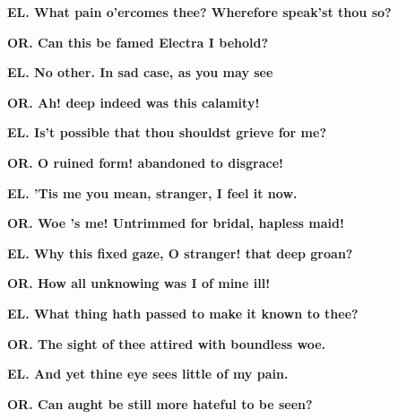 \documentclass[11pt,letter]{book}
\begin{document}
\par \textbf{EL. What pain o’ercomes thee? Wherefore speak’st thou so?}
\par 

\par \textbf{OR. Can this be famed Electra I behold?}
\par 

\par \textbf{EL. No other. In sad case, as you may see}
\par 

\par \textbf{OR. Ah! deep indeed was this calamity!}
\par 

\par \textbf{EL. Is’t possible that thou shouldst grieve for me?}
\par 

\par \textbf{OR. O ruined form! abandoned to disgrace!}
\par 

\par \textbf{EL. ’Tis me you mean, stranger, I feel it now.}
\par 

\par \textbf{OR. Woe ’s me! Untrimmed for bridal, hapless maid!}
\par 

\par \textbf{EL. Why this fixed gaze, O stranger! that deep groan?}
\par 

\par \textbf{OR. How all unknowing was I of mine ill!}
\par 

\par \textbf{EL. What thing hath passed to make it known to thee?}
\par 

\par \textbf{OR. The sight of thee attired with boundless woe.}
\par 

\par \textbf{EL. And yet thine eye sees little of my pain.}
\par 

\par \textbf{OR. Can aught be still more hateful to be seen?}
\par 
\end{document}
